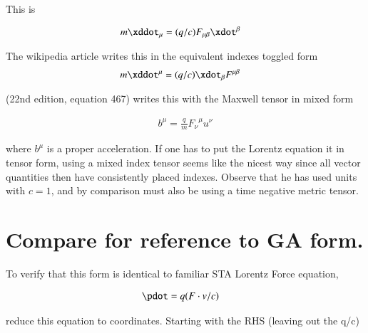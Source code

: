 This is

\begin{align}\label{eqn:maxwell_tensor_lagrangian:fromLagrangian}
m \xddot_\mu &= (q/c) F_{\mu\beta} \xdot^\beta 
\end{align}

The wikipedia article \cite{wikiLorentzForce} writes this in the equivalent indexes toggled form
\begin{align*}
m \xddot^\mu &= (q/c) \xdot_\beta F^{\mu\beta}
\end{align*}

\cite{schiller:mm} (22nd edition, equation 467) writes this with the
Maxwell tensor in mixed form

\begin{align*}
b^\mu = \frac{q}{m} {F_\nu}^\mu u^\nu
\end{align*}

where $b^\mu$ is a proper acceleration.  If one has to put the Lorentz 
equation it in tensor
form, using a mixed index tensor seems like the nicest way since all
vector quantities then have consistently placed indexes.  Observe that he has used units with $c=1$, and by comparison must
also be using a time negative metric tensor.

%

\section{Compare for reference to GA form. }

To verify that this form is identical to familiar STA Lorentz Force equation,

\begin{align}
\pdot &= q (F \cdot v/c) 
\end{align}

reduce this equation to coordinates.  Starting with the RHS (leaving out the q/c)

